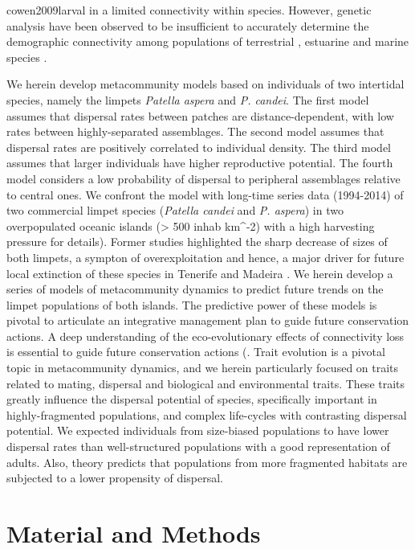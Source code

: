 \documentclass[12pt]{article}
\begin{document}
\begin{flushleft}
{{{{{{cowen2009larval} in a limited connectivity within species. However, genetic analysis have been observed to be insufficient to accurately determine the demographic connectivity among populations of terrestrial \citep{chapuis2011challenges}, estuarine \citep{turner2002genetic} and marine species \citep{hawkins2016fisheries}.

We herein develop metacommunity models based on individuals of two intertidal species, namely the limpets \textit{Patella aspera} and \textit{P. candei}. The first model assumes that dispersal rates between patches are distance-dependent, with low rates between highly-separated assemblages. The second model assumes that dispersal rates are positively correlated to individual density. The third model assumes that larger individuals have higher reproductive potential. The fourth model considers a low probability of dispersal to peripheral assemblages relative to central ones. We confront the model with long-time series data (1994-2014) of two commercial limpet species (\textit{Patella candei} and \textit{P. aspera}) in two overpopulated oceanic islands (> 500 inhab km^{-2}) with a high harvesting pressure \citep{riera2016clear, sousa2019long} for details). Former studies highlighted the sharp decrease of sizes of both limpets, a sympton of overexploitation and hence, a major driver for future local extinction of these species in Tenerife \citep{riera2016clear} and Madeira \citep{sousa2019long}. We herein develop a series of models  of metacommunity dynamics to predict future trends on the limpet populations of both islands. The predictive power of these models is pivotal to articulate an integrative management plan to guide future conservation actions. A deep understanding of the eco-evolutionary effects of connectivity loss is essential to guide future conservation actions (\citep{travis2013dispersal, urban2001landscape}. Trait evolution is a pivotal topic in metacommunity dynamics, and we herein particularly focused on traits related to mating, dispersal and biological and environmental traits. These traits greatly influence the dispersal potential of species, specifically important in highly-fragmented populations, and complex life-cycles with contrasting dispersal potential.
We expected individuals from size-biased populations to have lower dispersal rates than well-structured populations with a good representation of adults. Also, theory predicts that populations from more fragmented habitats are subjected to a lower propensity of dispersal.

\section{Material and Methods}
}}}}}
\end{flushleft}
\end{document}
